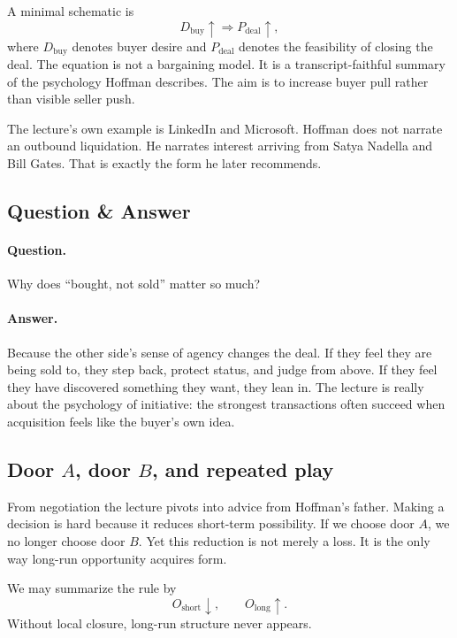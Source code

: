 A minimal schematic is
\begin{equation}
D_{\mathrm{buy}}\uparrow \Longrightarrow P_{\mathrm{deal}}\uparrow,
\end{equation}
where \(D_{\mathrm{buy}}\) denotes buyer desire and \(P_{\mathrm{deal}}\) denotes the feasibility of closing the deal. The equation is not a bargaining model. It is a transcript-faithful summary of the psychology Hoffman describes. The aim is to increase buyer pull rather than visible seller push.

The lecture's own example is LinkedIn and Microsoft. Hoffman does not narrate an outbound liquidation. He narrates interest arriving from Satya Nadella and Bill Gates. That is exactly the form he later recommends.

\subsection{Question \& Answer}

\paragraph{Question.}
Why does ``bought, not sold'' matter so much?

\paragraph{Answer.}
Because the other side's sense of agency changes the deal. If they feel they are being sold to, they step back, protect status, and judge from above. If they feel they have discovered something they want, they lean in. The lecture is really about the psychology of initiative: the strongest transactions often succeed when acquisition feels like the buyer's own idea.

\subsection{Door \(A\), door \(B\), and repeated play}

From negotiation the lecture pivots into advice from Hoffman's father. Making a decision is hard because it reduces short-term possibility. If we choose door \(A\), we no longer choose door \(B\). Yet this reduction is not merely a loss. It is the only way long-run opportunity acquires form.

We may summarize the rule by
\begin{equation}
O_{\mathrm{short}}\downarrow, \qquad O_{\mathrm{long}}\uparrow.
\end{equation}
Without local closure, long-run structure never appears.

